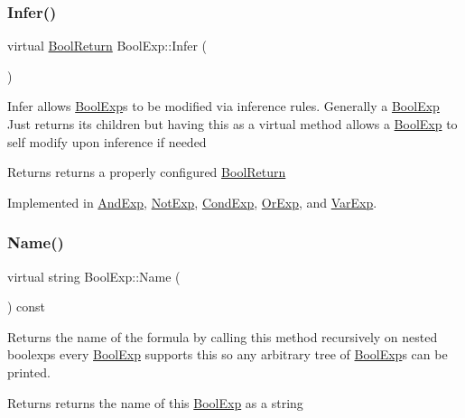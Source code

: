 \subsubsection{\texorpdfstring{Infer()}{Infer()}}
{\footnotesize\ttfamily virtual \mbox{\hyperlink{structBoolReturn}{Bool\+Return}} Bool\+Exp\+::\+Infer (\begin{DoxyParamCaption}{ }\end{DoxyParamCaption})\hspace{0.3cm}{\ttfamily [pure virtual]}}

Infer allows \mbox{\hyperlink{classBoolExp}{Bool\+Exp}}\textquotesingle{}s to be modified via inference rules. Generally a \mbox{\hyperlink{classBoolExp}{Bool\+Exp}} Just returns its children but having this as a virtual method allows a \mbox{\hyperlink{classBoolExp}{Bool\+Exp}} to self modify upon inference if needed \begin{DoxyReturn}{Returns}
returns a properly configured \mbox{\hyperlink{structBoolReturn}{Bool\+Return}} 
\end{DoxyReturn}


Implemented in \mbox{\hyperlink{classAndExp_a26390e42318a13aa0f03a4e5ccbb0270}{And\+Exp}}, \mbox{\hyperlink{classNotExp_ad7ec5fee6dd934a3db7f72cc9e0b809a}{Not\+Exp}}, \mbox{\hyperlink{classCondExp_a3824041035f12f58e583181b57491668}{Cond\+Exp}}, \mbox{\hyperlink{classOrExp_aa3b98be68c00bc0c43a9eec5a47cdec9}{Or\+Exp}}, and \mbox{\hyperlink{classVarExp_a6c3e1736ade0456d23085923bc3fef61}{Var\+Exp}}.

\mbox{\label{classBoolExp_a3fdb64a9b8fd54e33d755ff4a577d11a}} 
\subsubsection{\texorpdfstring{Name()}{Name()}}
{\footnotesize\ttfamily virtual string Bool\+Exp\+::\+Name (\begin{DoxyParamCaption}{ }\end{DoxyParamCaption}) const\hspace{0.3cm}{\ttfamily [pure virtual]}}

Returns the name of the formula by calling this method recursively on nested boolexp\textquotesingle{}s every \mbox{\hyperlink{classBoolExp}{Bool\+Exp}} supports this so any arbitrary tree of \mbox{\hyperlink{classBoolExp}{Bool\+Exp}}\textquotesingle{}s can be printed. \begin{DoxyReturn}{Returns}
returns the name of this \mbox{\hyperlink{classBoolExp}{Bool\+Exp}} as a string 
\end{DoxyReturn}


